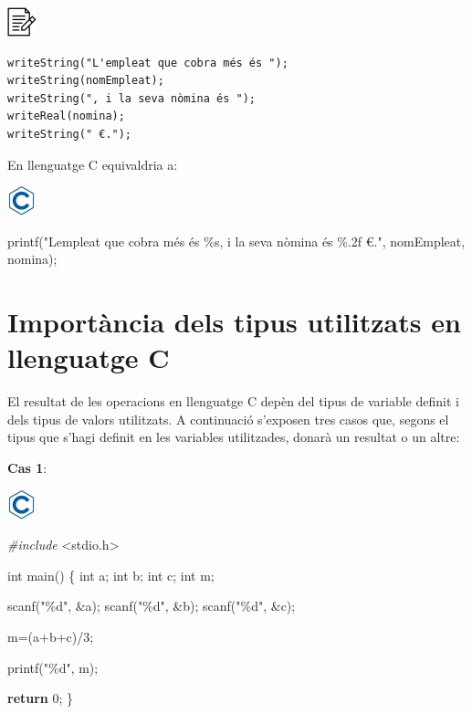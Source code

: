 \documentclass[]{book}
\newenvironment{Shaded}{\begin{snugshade}}{\end{snugshade}}
\newcommand{\ControlFlowTok}[1]{\textcolor[rgb]{0.13,0.29,0.53}{\textbf{#1}}}
\newcommand{\DataTypeTok}[1]{\textcolor[rgb]{0.13,0.29,0.53}{#1}}
\newcommand{\DecValTok}[1]{\textcolor[rgb]{0.00,0.00,0.81}{#1}}
\newcommand{\ImportTok}[1]{#1}
\newcommand{\NormalTok}[1]{#1}
\newcommand{\PreprocessorTok}[1]{\textcolor[rgb]{0.56,0.35,0.01}{\textit{#1}}}
\newcommand{\StringTok}[1]{\textcolor[rgb]{0.31,0.60,0.02}{#1}}
\begin{document}
\includegraphics{./img/alg.png}

\begin{verbatim}
writeString("L'empleat que cobra més és ");
writeString(nomEmpleat);
writeString(", i la seva nòmina és ");
writeReal(nomina);
writeString(" €.");
\end{verbatim}

En llenguatge C equivaldria a:

\includegraphics{./img/c.png}

\begin{Shaded}
\begin{Highlighting}[]
\NormalTok{printf(}\StringTok{"L\textquotesingle{}empleat que cobra més és \%s, i la seva nòmina és \%.2f €."}\NormalTok{, nomEmpleat, nomina);}
\end{Highlighting}
\end{Shaded}

\hypertarget{importancia-dels-tipus-utilitzats-en-llenguatge-c}{%
\section{Importància dels tipus utilitzats en llenguatge C}\label{importancia-dels-tipus-utilitzats-en-llenguatge-c}}

El resultat de les operacions en llenguatge C depèn del tipus de variable definit i dels tipus de valors utilitzats. A continuació s'exposen tres casos que, segons el tipus que s'hagi definit en les variables utilitzades, donarà un resultat o un altre:

\textbf{Cas 1}:

\includegraphics{./img/c.png}

\begin{Shaded}
\begin{Highlighting}[]
\PreprocessorTok{\#include }\ImportTok{\textless{}stdio.h\textgreater{}}

\DataTypeTok{int}\NormalTok{ main() \{}
   \DataTypeTok{int}\NormalTok{ a;}
   \DataTypeTok{int}\NormalTok{ b;}
   \DataTypeTok{int}\NormalTok{ c;}
   \DataTypeTok{int}\NormalTok{ m;}

\NormalTok{   scanf(}\StringTok{"\%d"}\NormalTok{, \&a);}
\NormalTok{   scanf(}\StringTok{"\%d"}\NormalTok{, \&b);}
\NormalTok{   scanf(}\StringTok{"\%d"}\NormalTok{, \&c);}

\NormalTok{   m=(a+b+c)/}\DecValTok{3}\NormalTok{;}

\NormalTok{   printf(}\StringTok{"\%d"}\NormalTok{, m);}

   \ControlFlowTok{return} \DecValTok{0}\NormalTok{;}
\NormalTok{\}}
\end{Highlighting}
\end{Shaded}
\end{document}
